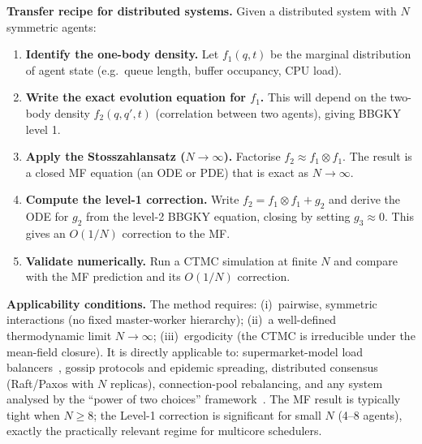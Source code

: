 \documentclass[11pt,a4paper]{report}
\begin{document}
\medskip
\noindent\textbf{Transfer recipe for distributed systems.}
Given a distributed system with $N$ symmetric agents:
\begin{enumerate}
  \item \textbf{Identify the one-body density.}
        Let $f_1(q, t)$ be the marginal distribution of agent state
        (e.g.\ queue length, buffer occupancy, CPU load).
  \item \textbf{Write the exact evolution equation for $f_1$.}
        This will depend on the two-body density $f_2(q, q', t)$
        (correlation between two agents), giving BBGKY level 1.
  \item \textbf{Apply the Stosszahlansatz ($N \to \infty$).}
        Factorise $f_2 \approx f_1 \otimes f_1$.  The result is a
        closed MF equation (an ODE or PDE) that is exact as $N \to \infty$.
  \item \textbf{Compute the level-1 correction.}
        Write $f_2 = f_1 \otimes f_1 + g_2$ and derive the ODE for
        $g_2$ from the level-2 BBGKY equation, closing by setting
        $g_3 \approx 0$.  This gives an $O(1/N)$ correction to the MF.
  \item \textbf{Validate numerically.}
        Run a CTMC simulation at finite $N$ and compare with the
        MF prediction and its $O(1/N)$ correction.
\end{enumerate}

\medskip
\noindent\textbf{Applicability conditions.}
The method requires:
(i)~pairwise, symmetric interactions (no fixed master-worker hierarchy);
(ii)~a well-defined thermodynamic limit $N \to \infty$;
(iii)~ergodicity (the CTMC is irreducible under the mean-field closure).
It is directly applicable to: supermarket-model load balancers~\cite{mitzenmacher2001,vvedenskaya1996},
gossip protocols and epidemic spreading, distributed consensus
(Raft/Paxos with $N$ replicas), connection-pool rebalancing,
and any system analysed by the ``power of two choices'' framework~\cite{azar1999}.
The MF result is typically tight when $N \geq 8$; the Level-1 correction
is significant for small $N$ (4--8 agents), exactly the practically
relevant regime for multicore schedulers.
\end{document}

